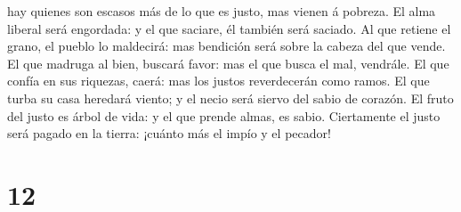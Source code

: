 hay quienes son escasos más de lo que es justo, mas vienen á pobreza.
 El alma liberal será engordada: y el que saciare, él
también será saciado.  Al que retiene el grano, el pueblo
lo maldecirá: mas bendición será sobre la cabeza del que vende.
 El que madruga al bien, buscará favor: mas el que busca el
mal, vendrále.  El que confía en sus riquezas, caerá: mas
los justos reverdecerán como ramos.  El que turba su casa
heredará viento; y el necio será siervo del sabio de corazón.
 El fruto del justo es árbol de vida: y el que prende
almas, es sabio.  Ciertamente el justo será pagado en la
tierra: ¡cuánto más el impío y el pecador!

\hypertarget{section-11}{%
\section{12}\label{section-11}}

